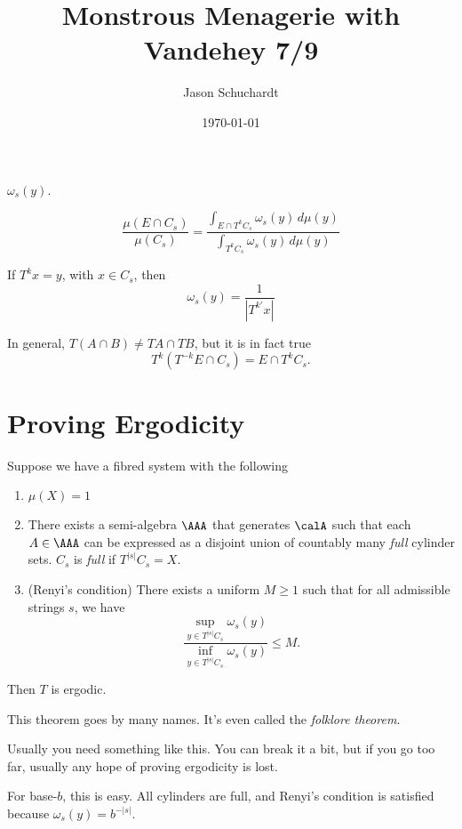 \documentclass{article}
\title{Monstrous Menagerie with Vandehey 7/9}
\author{Jason Schuchardt}
\date{\today}
\begin{document}
\maketitle

$\omega_s(y)$.

\[\frac{\mu(E\cap C_s)}{\mu(C_s)} 
= \frac{\int_{E\cap T^kC_s} \omega_s(y)\,d\mu(y)}{
    \int_{T^kC_s} \omega_s(y)\,d\mu(y)
}
\]

If $T^kx = y$, with $x\in C_s$, then 
\[\omega_s(y) = \frac{1}{|T^{k\prime}x|}\]

\begin{remark}
    In general, $T(A\cap B) \ne TA \cap TB$, but it is in 
    fact true 
    \[T^k(T^{-k}E\cap C_s) = E\cap T^kC_s. \]
\end{remark}
\section{Proving Ergodicity}

\begin{theorem}
    Suppose we have a fibred system with the following
    \begin{enumerate}
        \item $\mu(X)=1$
        \item There exists a semi-algebra $\AAA$ that 
            generates $\calA$ such that each $A\in \AAA$
            can be expressed as a disjoint union of 
            countably many \emph{full} cylinder sets.
            $C_s$ is \emph{full} if $T^{|s|}C_s = X$.
        \item (Renyi's condition) There exists a uniform
            $M\ge 1$ such that for all admissible strings
            $s$, we have 
            \[
                \frac{\sup_{y\in T^{|s|}C_s} \omega_s(y)}{
                    \inf_{y\in T^{|s|}C_s} \omega_s(y)
                } \le M.
            \]
    \end{enumerate}

    Then $T$ is ergodic.
\end{theorem}

This theorem goes by many names. It's even called the 
\emph{folklore theorem}.

Usually you need something like this. You can break it a
bit, but if you go too far, usually any hope of proving
ergodicity is lost.

\begin{example}[Base-$b$]
    For base-$b$, this is easy. All cylinders are full,
    and Renyi's condition is satisfied because 
    $\omega_s(y) = b^{-|s|}$.
\end{example}
\end{document}
